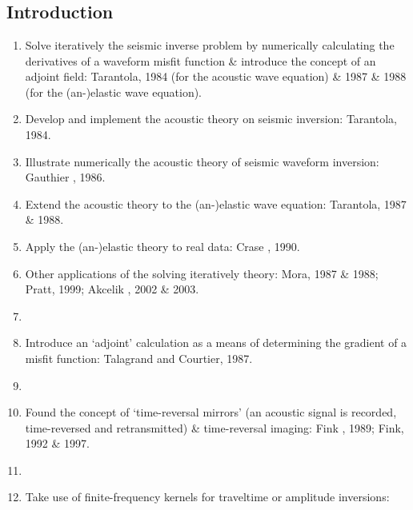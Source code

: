 \renewcommand{\pmk}{Tromp\_2005\_GJI\_Adjoint methods}
\renewcommand{\prf}{FWI/\pmk.pdf}
\renewcommand{\pti}{Seismic tomography, adjoint methods, time reversal and banana-doughnut kernels}
\renewcommand{\pay}{Jeroen Tromp, Carl Tape and Qinya Liu, 2005}
\renewcommand{\pjo}{Geophys. J. Int.}
\renewcommand{\pda}{2016/10/17 Mon.}

\section{\pinfo}
\subsection{Introduction}
\begin{enumerate}[\hspace{10mm}*]
  \item Solve iteratively the seismic inverse problem
    by numerically calculating the \Frechet derivatives of a waveform misfit function
    \& introduce the concept of an adjoint field:
    Tarantola, 1984 (for the acoustic wave equation)
    \& 1987 \& 1988 (for the (an-)elastic wave equation).
  \item Develop and implement the acoustic theory on seismic inversion: Tarantola, 1984.
  \item Illustrate numerically the acoustic theory of seismic waveform inversion:
    Gauthier \etal, 1986.
  \item Extend the acoustic theory to the (an-)elastic wave equation: Tarantola, 1987 \& 1988.
  \item Apply the (an-)elastic theory to real data: Crase \etal, 1990.
  \item Other applications of the solving iteratively theory:
    Mora, 1987 \& 1988; Pratt, 1999; Akcelik \etal, 2002 \& 2003.
  \item \sline
  \item Introduce an `adjoint' calculation as a means of determining the gradient
    of a misfit function: Talagrand and Courtier, 1987.
  \item \sline
  \item Found the concept of `time-reversal mirrors'
    (an acoustic signal is recorded, time-reversed and retransmitted)
    \& time-reversal imaging:
    Fink \etal, 1989; Fink, 1992 \& 1997.
  \item \sline
  \item Take use of finite-frequency kernels for traveltime or amplitude inversions:

\end{enumerate}
